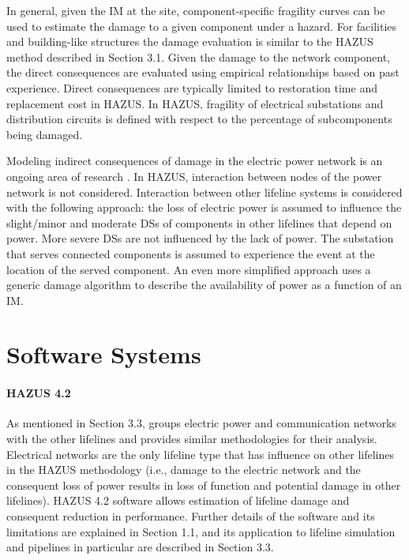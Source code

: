 In general, given the IM at the site, component-specific fragility curves can be used to estimate the damage to a given component under a hazard. For facilities and building-like structures the damage evaluation is similar to the HAZUS method described in Section 3.1. Given the damage to the network component, the direct consequences are evaluated using empirical relationships based on past experience. Direct consequences are typically limited to restoration time and replacement cost in HAZUS. In HAZUS, fragility of electrical substations and distribution circuits is defined with respect to the percentage of subcomponents being damaged.

Modeling indirect consequences of damage in the electric power network is an ongoing area of research \citep{moore2005using}. In HAZUS, interaction between nodes of the power network is not considered. Interaction between other lifeline systems is considered with the following approach: the loss of electric power is assumed to influence the slight/minor and moderate DSs of components in other lifelines that depend on power. More severe DSs are not influenced by the lack of power. The substation that serves connected components is assumed to experience the event at the location of the served component. An even more simplified approach uses a generic damage algorithm to describe the availability of power as a function of an IM. 

\section{Software Systems}
\label{sec:perf_power_tools}

\paragraph{HAZUS 4.2} As mentioned in Section 3.3,  groups electric power and communication networks with the other lifelines and provides similar methodologies for their analysis. Electrical networks are the only lifeline type that has influence on other lifelines in the HAZUS methodology (i.e., damage to the electric network and the consequent loss of power results in loss of function and potential damage in other lifelines). HAZUS 4.2 software allows estimation of lifeline damage and consequent reduction in performance. Further details of the software and its limitations are explained in Section 1.1, and its application to lifeline simulation and pipelines in particular are described in Section 3.3.

